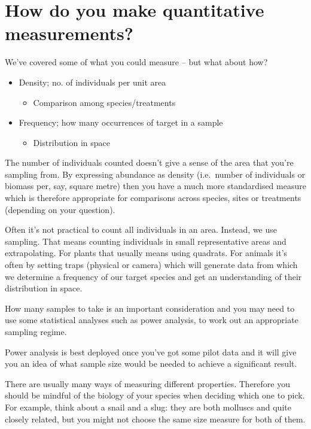 \documentclass[
  letterpaper,
  DIV=11,
  numbers=noendperiod]{scrreprt}
\providecommand{\tightlist}{%
  \setlength{\itemsep}{0pt}\setlength{\parskip}{0pt}}
\begin{document}
\section{How do you make quantitative
measurements?}\label{how-do-you-make-quantitative-measurements}

We've covered some of what you could measure -- but what about how?

\begin{itemize}
\tightlist
\item
  Density; no. of individuals per unit area

  \begin{itemize}
  \tightlist
  \item
    Comparison among species/treatments
  \end{itemize}
\item
  Frequency; how many occurrences of target in a sample

  \begin{itemize}
  \tightlist
  \item
    Distribution in space
  \end{itemize}
\end{itemize}

The number of individuals counted doesn't give a sense of the area that
you're sampling from. By expressing abundance as density (i.e.~number of
individuals or biomass per, say, square metre) then you have a much more
standardised measure which is therefore appropriate for comparisons
across species, sites or treatments (depending on your question).

Often it's not practical to count all individuals in an area. Instead,
we use sampling. That means counting individuals in small representative
areas and extrapolating. For plants that usually means using quadrats.
For animals it's often by setting traps (physical or camera) which will
generate data from which we determine a frequency of our target species
and get an understanding of their distribution in space.

How many samples to take is an important consideration and you may need
to use some statistical analyses such as power analysis, to work out an
appropriate sampling regime.

Power analysis is best deployed once you've got some pilot data and it
will give you an idea of what sample size would be needed to achieve a
significant result.

There are usually many ways of measuring different properties. Therefore
you should be mindful of the biology of your species when deciding which
one to pick. For example, think about a snail and a slug: they are both
molluscs and quite closely related, but you might not choose the same
size measure for both of them.
\end{document}
